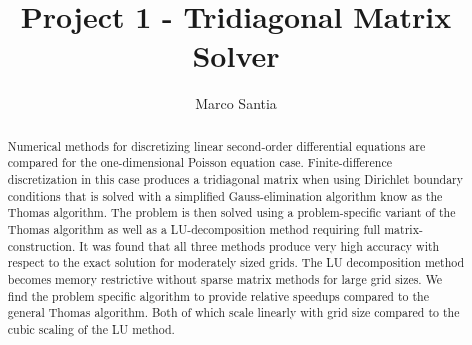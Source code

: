 \documentclass[10pt, a4paper]{amsart}
\title{Project 1 - Tridiagonal Matrix Solver}
\author{Marco Santia}
\begin{document}
\begin{abstract}
Numerical methods for discretizing linear second-order differential equations are compared for the one-dimensional Poisson equation case. Finite-difference discretization in this case produces a tridiagonal matrix when using Dirichlet boundary conditions that is solved with a simplified Gauss-elimination algorithm know as the Thomas algorithm. The problem is then solved using a problem-specific variant of the Thomas algorithm as well as a LU-decomposition method requiring full matrix-construction. It was found that all three methods produce very high accuracy with respect to the exact solution for moderately sized grids. The LU decomposition method becomes memory restrictive without sparse matrix methods for large grid sizes. We find the problem specific algorithm to provide relative speedups compared to the general Thomas algorithm. Both of which scale linearly with grid size compared to the cubic scaling of the LU method. 

\end{abstract}
\maketitle
\end{document}
